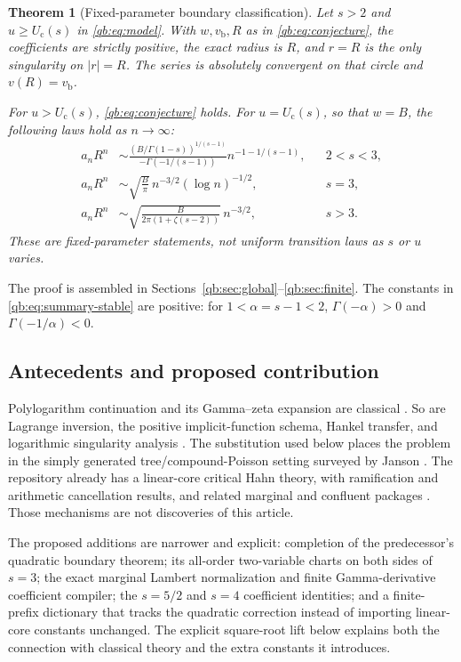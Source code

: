 \documentclass[11pt,a4paper]{article}
\newtheorem{theorem}{Theorem}[section]
\theoremstyle{definition}\newtheorem{definition}[theorem]{Definition}
\theoremstyle{remark}\newtheorem{remark}[theorem]{Remark}
\newcommand{\Uc}{U_{\mathrm c}}
\newcommand{\vb}{v_{\mathrm b}}
\numberwithin{equation}{section}
\begin{document}
\begin{theorem}[Fixed-parameter boundary classification]\label{qb:thm:summary}
Let $s>2$ and $u\ge\Uc(s)$ in \eqref{qb:eq:model}. With $w,\vb,R$ as in
\eqref{qb:eq:conjecture}, the coefficients are strictly positive, the exact
radius is $R$, and $r=R$ is the only singularity on $|r|=R$. The series is
absolutely convergent on that circle and $v(R)=\vb$.

For $u>\Uc(s)$, \eqref{qb:eq:conjecture} holds. For $u=\Uc(s)$, so that
$w=B$, the following laws hold as $n\to\infty$:
\begin{align}
 a_n R^n&\sim
 \frac{(B/\Gamma(1-s))^{1/(s-1)}}{-\Gamma(-1/(s-1))}
 n^{-1-1/(s-1)}, &&2<s<3,\label{qb:eq:summary-stable}\\
 a_n R^n&\sim \sqrt{\frac{B}{\pi}}\,
 n^{-3/2}(\log n)^{-1/2}, &&s=3,\label{qb:eq:summary-log}\\
 a_n R^n&\sim
 \sqrt{\frac{B}{2\pi(1+\zeta(s-2))}}\,n^{-3/2}, &&s>3.
 \label{qb:eq:summary-finite}
\end{align}
These are fixed-parameter statements, not uniform transition laws as $s$
or $u$ varies.
\end{theorem}

The proof is assembled in Sections~\ref{qb:sec:global}--\ref{qb:sec:finite}.
The constants in \eqref{qb:eq:summary-stable} are positive: for
$1<\alpha=s-1<2$, $\Gamma(-\alpha)>0$ and
$\Gamma(-1/\alpha)<0$.

\subsection{Antecedents and proposed contribution}

Polylogarithm continuation and its Gamma--zeta expansion are classical
\cite{dlmfpoly}. So are Lagrange inversion, the positive implicit-function
schema, Hankel transfer, and logarithmic singularity analysis
\cite{fo,fs}. The substitution used below places the problem in the simply
generated tree/compound-Poisson setting surveyed by Janson \cite{janson}.
The repository already has a linear-core critical Hahn theory, with
ramification and arithmetic cancellation results, and related marginal
and confluent packages \cite{repocritical,repotrans}. Those mechanisms are
not discoveries of this article.

The proposed additions are narrower and explicit: completion of the
predecessor's quadratic boundary theorem; its all-order two-variable
charts on both sides of $s=3$; the exact marginal Lambert normalization and
finite Gamma-derivative coefficient compiler; the $s=5/2$ and $s=4$
coefficient identities; and a finite-prefix dictionary that tracks the
quadratic correction instead of importing linear-core constants unchanged.
The explicit square-root lift below explains both the connection with
classical theory and the extra constants it introduces.
\end{document}
